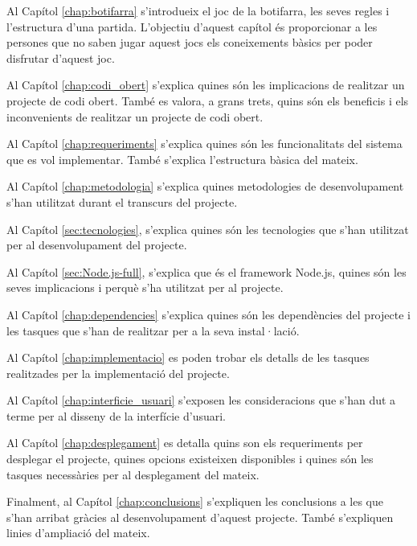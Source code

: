 Al Capítol \ref{chap:botifarra} s'introdueix el joc de la botifarra, les seves regles i l'estructura d'una partida. L'objectiu d'aquest capítol és proporcionar a les persones que no saben jugar aquest jocs els coneixements bàsics per poder disfrutar d'aquest joc. 

Al Capítol \ref{chap:codi_obert} s'explica quines són les implicacions de realitzar un projecte de codi obert. També es valora, a grans trets, quins són els beneficis i els inconvenients de realitzar un projecte de codi obert.

Al Capítol \ref{chap:requeriments} s'explica quines són les funcionalitats del sistema que es vol implementar. També s'explica l'estructura bàsica del mateix. 

Al Capítol \ref{chap:metodologia} s'explica quines metodologies de desenvolupament s'han utilitzat durant el transcurs del projecte.

Al Capítol \ref{sec:tecnologies}, s'explica quines són les tecnologies que s'han utilitzat per al desenvolupament del projecte.

Al Capítol \ref{sec:Node.js-full}, s'explica que és el framework Node.js, quines són les seves implicacions i perquè s'ha utilitzat per al projecte. 

Al Capítol \ref{chap:dependencies} s'explica quines són les dependències del projecte i les tasques que s'han de realitzar per a la seva instal·lació. 

Al Capítol \ref{chap:implementacio} es poden trobar els detalls de les tasques realitzades per la implementació del projecte. 

Al Capítol \ref{chap:interficie_usuari} s'exposen les consideracions que s'han dut a terme per al disseny de la interfície d'usuari.

Al Capítol \ref{chap:desplegament} es detalla quins son els requeriments per desplegar el projecte, quines opcions existeixen disponibles i quines són les tasques necessàries per al desplegament del mateix. 

Finalment, al Capítol \ref{chap:conclusions} s'expliquen les conclusions a les que s'han arribat gràcies al desenvolupament d'aquest projecte. També s'expliquen linies d'ampliació del mateix.
